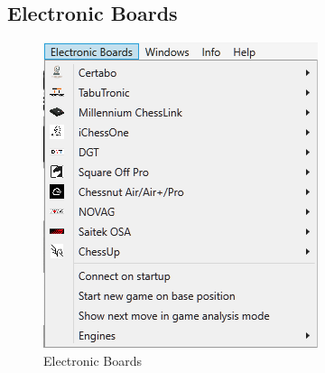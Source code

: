 \documentclass[11pt,a4paper]{article}
\begin{document}
\subsection{Electronic Boards}
\begin{figure}[H]
	\centering
	\includegraphics[scale=1.0]{ElectronicBoards.png}
	\caption{Electronic Boards}
	\label{fig:ElectronicBoards}
\end{figure}
\end{document}

